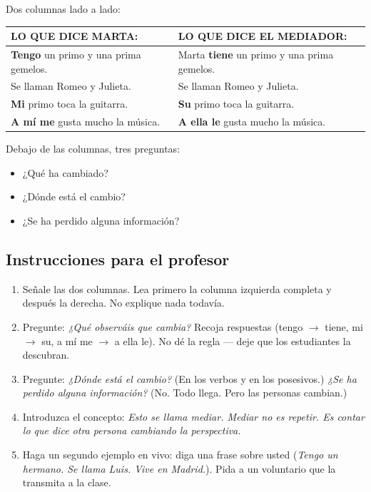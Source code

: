 \documentclass[a4paper,11pt]{article}
\begin{document}
Dos columnas lado a lado:

\begin{center}
\renewcommand{\arraystretch}{1.8}
\begin{tabular}{|>{\raggedright\arraybackslash}p{6.5cm}|>{\raggedright\arraybackslash}p{6.5cm}|}
\hline
\rowcolor{azulg!15}
\textbf{LO QUE DICE MARTA:} & \textbf{LO QUE DICE EL MEDIADOR:} \\
\hline
\textbf{\textcolor{rojog}{Tengo}} un primo y una prima gemelos. & Marta \textbf{\textcolor{verde}{tiene}} un primo y una prima gemelos. \\
\hline
Se llaman Romeo y Julieta. & Se llaman Romeo y Julieta. \\
\hline
\textbf{\textcolor{rojog}{Mi}} primo toca la guitarra. & \textbf{\textcolor{verde}{Su}} primo toca la guitarra. \\
\hline
\textbf{\textcolor{rojog}{A mí me}} gusta mucho la música. & \textbf{\textcolor{verde}{A ella le}} gusta mucho la música. \\
\hline
\end{tabular}
\end{center}

\vspace{0.3cm}

Debajo de las columnas, tres preguntas:
\begin{itemize}[leftmargin=2cm, itemsep=3pt]
\item ¿Qué ha cambiado?
\item ¿Dónde está el cambio?
\item ¿Se ha perdido alguna información?
\end{itemize}

\vspace{0.5cm}

\subsection*{Instrucciones para el profesor}

\begin{enumerate}[leftmargin=1.5cm, itemsep=4pt]
\item Señale las dos columnas. Lea primero la columna izquierda completa y después la derecha. No explique nada todavía.
\item Pregunte: \textit{¿Qué observáis que cambia?} Recoja respuestas (tengo $\rightarrow$ tiene, mi $\rightarrow$ su, a mí me $\rightarrow$ a ella le). No dé la regla — deje que los estudiantes la descubran.
\item Pregunte: \textit{¿Dónde está el cambio?} (En los verbos y en los posesivos.) \textit{¿Se ha perdido alguna información?} (No. Todo llega. Pero las personas cambian.)
\item Introduzca el concepto: \textit{Esto se llama mediar. Mediar no es repetir. Es contar lo que dice otra persona cambiando la perspectiva.}
\item Haga un segundo ejemplo en vivo: diga una frase sobre usted (\textit{Tengo un hermano. Se llama Luis. Vive en Madrid.}). Pida a un voluntario que la transmita a la clase.
\end{enumerate}
\end{document}
